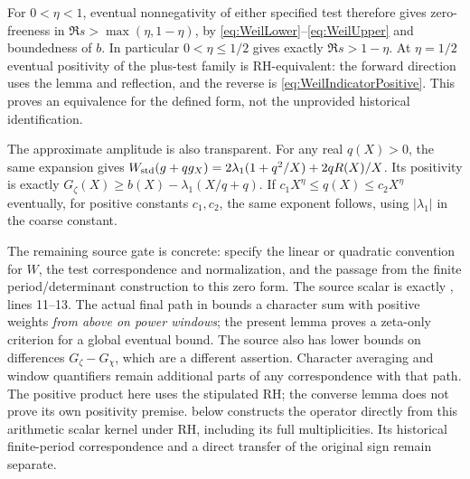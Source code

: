 For $0<\eta<1$, eventual nonnegativity of either specified test therefore gives zero-freeness in $\Re s>\max(\eta,1-\eta)$, by \eqref{eq:WeilLower}--\eqref{eq:WeilUpper} and boundedness of $b$. In particular $0<\eta\le1/2$ gives exactly $\Re s>1-\eta$. At $\eta=1/2$ eventual positivity of the plus-test family is RH-equivalent: the forward direction uses the lemma and reflection, and the reverse is \eqref{eq:WeilIndicatorPositive}. This proves an equivalence for the defined form, not the unprovided historical identification.

The approximate amplitude is also transparent. For any real $q(X)>0$, the same expansion gives
$W_{\rm std}(g+qg_X)=2\lambda_1(1+q^2/X)+2qR(X)/X$.
Its positivity is exactly $G_\zeta(X)\ge b(X)-\lambda_1(X/q+q)$.
If $c_1X^\eta\le q(X)\le c_2X^\eta$ eventually, for positive constants $c_1,c_2$, the same exponent follows, using $|\lambda_1|$ in the coarse constant.

The remaining source gate is concrete: specify the linear or quadratic convention for $W$, the test correspondence and normalization, and the passage from the finite period/determinant construction to this zero form. The source scalar is exactly , lines 11--13. The actual final path in  bounds a character sum with positive weights \emph{from above on power windows}; the present lemma proves a zeta-only criterion for a global eventual bound. The source also has lower bounds on differences $G_\zeta-G_\chi$, which are a different assertion. Character averaging and window quantifiers remain additional parts of any correspondence with that path. The positive product here uses the stipulated RH; the converse lemma does not prove its own positivity premise.  below constructs the operator directly from this arithmetic scalar kernel under RH, including its full multiplicities. Its historical finite-period correspondence and a direct transfer of the original sign remain separate.
